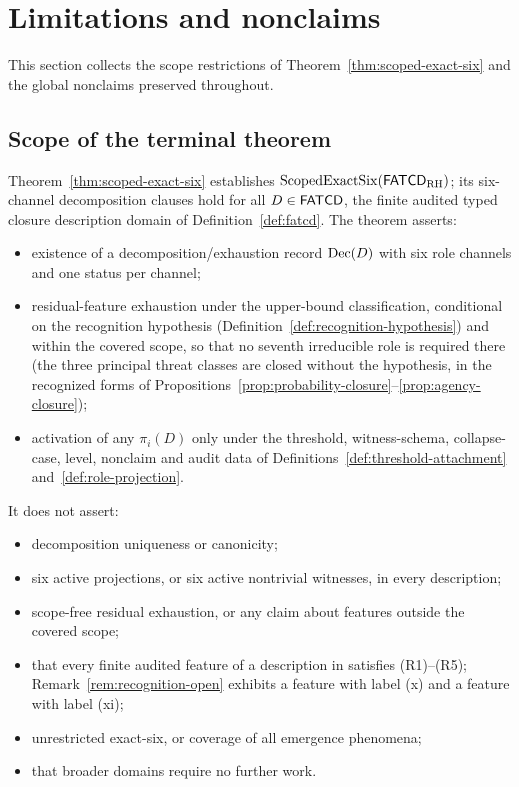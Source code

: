 \section{Limitations and nonclaims}\label{sec:limitations-nonclaims}


This section collects the scope restrictions of
Theorem~\ref{thm:scoped-exact-six} and the global nonclaims
preserved throughout.

\subsection{Scope of the terminal theorem}\label{subsec:terminal-scope}

Theorem~\ref{thm:scoped-exact-six} establishes
\(\operatorname{ScopedExactSix}\!\left(\mathsf{FATCD}_{\mathrm{RH}}\right)\); its six-channel decomposition
clauses hold for all \(D\in\mathsf{FATCD}{}\), the finite audited typed closure
description domain of Definition~\ref{def:fatcd}. The theorem asserts:
\begin{itemize}[topsep=2pt,itemsep=1pt]
  \item existence of a decomposition/exhaustion record \(\operatorname{Dec}\!\left(D\right)\)
    with six role channels and one status per channel;
  \item residual-feature exhaustion under the upper-bound classification,
    conditional on the recognition hypothesis
    (Definition~\ref{def:recognition-hypothesis}) and within the covered scope,
    so that no seventh irreducible role is required there (the three principal
    threat classes are closed without the hypothesis, in the recognized
    forms of
    Propositions~\ref{prop:probability-closure}--\ref{prop:agency-closure});
  \item activation of any \(\pi_i(D)\) only under the threshold,
    witness-schema, collapse-case, level, nonclaim and audit data of
    Definitions~\ref{def:threshold-attachment} and~\ref{def:role-projection}.
\end{itemize}

It does not assert:
\begin{itemize}[topsep=2pt,itemsep=1pt]
  \item decomposition uniqueness or canonicity;
  \item six active projections, or six active nontrivial witnesses, in
    every description;
  \item scope-free residual exhaustion, or any claim about features
    outside the covered scope;
  \item that every finite audited feature of a description in \FATCD{}
    satisfies (R1)--(R5); Remark~\ref{rem:recognition-open} exhibits a
    feature with label (x) and a feature with label (xi);
  \item unrestricted exact-six, or coverage of all emergence
    phenomena;
  \item that broader domains require no further work.
\end{itemize}

